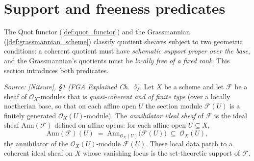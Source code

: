 \section{Support and freeness predicates}
\label{sec:quot_predicates}

The Quot functor (\cref{def:quot_functor}) and the Grassmannian
(\cref{def:grassmannian_scheme}) classify quotient sheaves subject to two
geometric conditions: a coherent quotient must have \emph{schematic support
proper over the base}, and the Grassmannian's quotients must be \emph{locally
free of a fixed rank}. This section introduces both predicates.

\begin{definition}\leanok
  \label{def:modules_annihilator}
  \textit{Source: [Nitsure], \S 1 (FGA Explained Ch.~5).}
  Let \(X\) be a scheme and let \(\mathcal{F}\) be a sheaf of
  \(\mathcal{O}_X\)-modules that is \emph{quasi-coherent and of finite type}
  (over a locally noetherian base, so that on each affine open \(U\) the section
  module \(\mathcal{F}(U)\) is a finitely generated \(\mathcal{O}_X(U)\)-module).
  The \emph{annihilator ideal sheaf} of \(\mathcal{F}\) is the ideal sheaf
  \(\mathrm{Ann}(\mathcal{F})\) defined on affine opens: for each affine open
  \(U \subseteq X\),
  \[
    \mathrm{Ann}(\mathcal{F})(U)
    \;=\; \mathrm{Ann}_{\mathcal{O}_X(U)}\bigl(\mathcal{F}(U)\bigr)
    \;\subseteq\; \mathcal{O}_X(U),
  \]
  the annihilator of the \(\mathcal{O}_X(U)\)-module \(\mathcal{F}(U)\). These
  local data patch to a coherent ideal sheaf on \(X\) whose vanishing locus is
  the set-theoretic support of \(\mathcal{F}\).


\end{definition}
